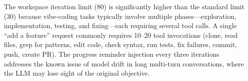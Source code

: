 The workspace iteration limit (80) is significantly higher than the standard limit (30) because vibe-coding tasks typically involve multiple phases---exploration, implementation, testing, and fixing---each requiring several tool calls. A single ``add a feature'' request commonly requires 10--20 tool invocations (clone, read files, grep for patterns, edit code, check syntax, run tests, fix failures, commit, push, create PR). The progress reminder injection every three iterations addresses the known issue of model drift in long multi-turn conversations, where the LLM may lose sight of the original objective.
